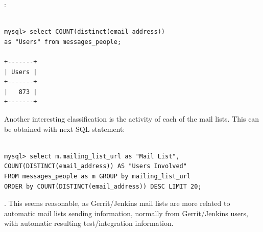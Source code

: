 \documentclass[a4paper, 12pt]{book}
\begin{document}
:

\begin{verbatim}

mysql> select COUNT(distinct(email_address))
as "Users" from messages_people;

+-------+
| Users |
+-------+
|   873 |
+-------+

\end{verbatim}
Another interesting classification is the activity of each of the mail lists. This can be obtained with next SQL statement:


\begin{verbatim}

mysql> select m.mailing_list_url as "Mail List",
COUNT(DISTINCT(email_address)) AS "Users Involved"
FROM messages_people as m GROUP by mailing_list_url
ORDER by COUNT(DISTINCT(email_address)) DESC LIMIT 20;

\end{verbatim}

. This seems reasonable, as Gerrit/Jenkins mail lists are more related to automatic mail lists sending information, normally from Gerrit/Jenkins users, with automatic resulting test/integration information.
\end{document}
